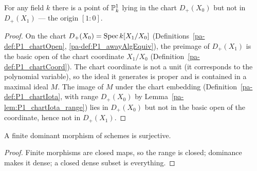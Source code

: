 \begin{lemma}
  \label{pa-lem:P1_point_off_chart1}
  \leanok

  For any field \(k\) there is a point of \(\mathbb{P}^1_k\) lying in the chart \(D_+(X_0)\) but
  not in \(D_+(X_1)\) — the origin \([1 : 0]\).
\end{lemma}
\begin{proof}
  \leanok
  On the chart \(D_+(X_0) = \operatorname{Spec} k[X_1/X_0]\) (Definitions~\ref{pa-def:P1_chartOpen},
  \ref{pa-def:P1_awayAlgEquiv}), the preimage of \(D_+(X_1)\) is the basic open of the chart
  coordinate \(X_1/X_0\) (Definition~\ref{pa-def:P1_chartCoord}). The chart coordinate is not
  a unit (it corresponds to the polynomial variable), so the ideal it generates is proper
  and is contained in a maximal ideal \(M\). The image of \(M\) under the chart embedding
  (Definition~\ref{pa-def:P1_chartIota}, with range \(D_+(X_0)\) by
  Lemma~\ref{pa-lem:P1_chartIota_range}) lies in \(D_+(X_0)\) but not in the basic open of the
  coordinate, hence not in \(D_+(X_1)\).
\end{proof}

\begin{lemma}
  \label{pa-lem:surjective_of_isFinite_of_isDominant}
  \leanok

  A finite dominant morphism of schemes is surjective.
\end{lemma}
\begin{proof}
  \leanok
  Finite morphisms are closed maps, so the range is closed; dominance makes it dense; a
  closed dense subset is everything.
\end{proof}

